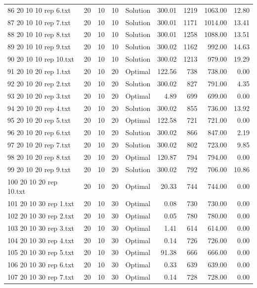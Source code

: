 \begin{longtable}{lrrllrrrr}
86 20 10 10 rep 6.txt & 20 & 10 & 10 & Solution & 300.01 & 1219 & 1063.00 & 12.80\\
87 20 10 10 rep 7.txt & 20 & 10 & 10 & Solution & 300.01 & 1171 & 1014.00 & 13.41\\
88 20 10 10 rep 8.txt & 20 & 10 & 10 & Solution & 300.01 & 1258 & 1088.00 & 13.51\\
89 20 10 10 rep 9.txt & 20 & 10 & 10 & Solution & 300.02 & 1162 & 992.00 & 14.63\\
90 20 10 10 rep 10.txt & 20 & 10 & 10 & Solution & 300.02 & 1213 & 979.00 & 19.29\\
91 20 10 20 rep 1.txt & 20 & 10 & 20 & Optimal & 122.56 & 738 & 738.00 &  0.00\\
92 20 10 20 rep 2.txt & 20 & 10 & 20 & Solution & 300.02 & 827 & 791.00 &  4.35\\
93 20 10 20 rep 3.txt & 20 & 10 & 20 & Optimal &  4.89 & 699 & 699.00 &  0.00\\
94 20 10 20 rep 4.txt & 20 & 10 & 20 & Solution & 300.02 & 855 & 736.00 & 13.92\\
95 20 10 20 rep 5.txt & 20 & 10 & 20 & Optimal & 122.58 & 721 & 721.00 &  0.00\\
96 20 10 20 rep 6.txt & 20 & 10 & 20 & Solution & 300.02 & 866 & 847.00 &  2.19\\
97 20 10 20 rep 7.txt & 20 & 10 & 20 & Solution & 300.02 & 802 & 723.00 &  9.85\\
98 20 10 20 rep 8.txt & 20 & 10 & 20 & Optimal & 120.87 & 794 & 794.00 &  0.00\\
99 20 10 20 rep 9.txt & 20 & 10 & 20 & Solution & 300.02 & 792 & 706.00 & 10.86\\
100 20 10 20 rep 10.txt & 20 & 10 & 20 & Optimal & 20.33 & 744 & 744.00 &  0.00\\
101 20 10 30 rep 1.txt & 20 & 10 & 30 & Optimal &  0.08 & 730 & 730.00 &  0.00\\
102 20 10 30 rep 2.txt & 20 & 10 & 30 & Optimal &  0.05 & 780 & 780.00 &  0.00\\
103 20 10 30 rep 3.txt & 20 & 10 & 30 & Optimal &  1.41 & 614 & 614.00 &  0.00\\
104 20 10 30 rep 4.txt & 20 & 10 & 30 & Optimal &  0.14 & 726 & 726.00 &  0.00\\
105 20 10 30 rep 5.txt & 20 & 10 & 30 & Optimal & 91.38 & 666 & 666.00 &  0.00\\
106 20 10 30 rep 6.txt & 20 & 10 & 30 & Optimal &  0.33 & 639 & 639.00 &  0.00\\
107 20 10 30 rep 7.txt & 20 & 10 & 30 & Optimal &  0.14 & 728 & 728.00 &  0.00\\

\end{longtable}

